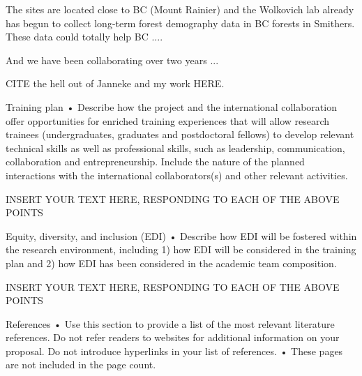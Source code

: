 \documentclass[11pt]{article}
\begin{document}
The sites are located close to BC (Mount Rainier) and the Wolkovich lab already has begun to collect long-term forest demography data in BC forests in Smithers. These data could totally help BC .... 

And we have been collaborating over two years ...
 
CITE the hell out of Janneke and my work HERE.

Training plan %
•	Describe how the project and the international collaboration offer opportunities for enriched training experiences that will allow research trainees (undergraduates, graduates and postdoctoral fellows) to develop relevant technical skills as well as professional skills, such as leadership, communication, collaboration and entrepreneurship. Include the nature of the planned interactions with the international collaborators(s) and other relevant activities.

INSERT YOUR TEXT HERE, RESPONDING TO EACH OF THE ABOVE POINTS

Equity, diversity, and inclusion (EDI) %
•	Describe how EDI will be fostered within the research environment, including 1) how EDI will be considered in the training plan and 2) how EDI has been considered in the academic team composition.

INSERT YOUR TEXT HERE, RESPONDING TO EACH OF THE ABOVE POINTS

References %
•	Use this section to provide a list of the most relevant literature references. Do not refer readers to websites for additional information on your proposal. Do not introduce hyperlinks in your list of references.
•	These pages are not included in the page count.


\end{document}
